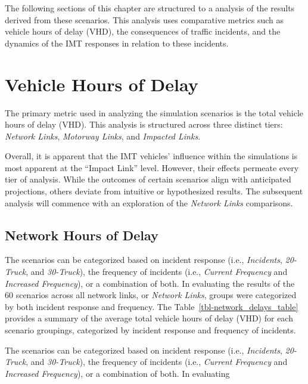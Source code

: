 \documentclass[fancy, oneside, mastersfancy, ms]{byuthesis}
\begin{document}
The following sections of this chapter are structured to a analysis of
the results derived from these scenarios. This analysis uses comparative
metrics such as vehicle hours of delay (VHD), the consequences of
traffic incidents, and the dynamics of the IMT responses in relation to
these incidents.

\hypertarget{vehicle-hours-of-delay}{%
\section{Vehicle Hours of Delay}\label{vehicle-hours-of-delay}}

The primary metric used in analyzing the simulation scenarios is the
total vehicle hours of delay (VHD). This analysis is structured across
three distinct tiers: \emph{Network Links}, \emph{Motorway Links}, and
\emph{Impacted Links}.

Overall, it is apparent that the IMT vehicles' influence within the
simulations is most apparent at the ``Impact Link'' level. However,
their effects permeate every tier of analysis. While the outcomes of
certain scenarios align with anticipated projections, others deviate
from intuitive or hypothesized results. The subsequent analysis will
commence with an exploration of the \emph{Network Links} comparisons.

\hypertarget{network-hours-of-delay}{%
\subsection{Network Hours of Delay}\label{network-hours-of-delay}}

The scenarios can be categorized based on incident response (i.e.,
\emph{Incidents}, \emph{20-Truck}, and \emph{30-Truck}), the frequency
of incidents (i.e., \emph{Current Frequency} and \emph{Increased
Frequency}), or a combination of both. In evaluating the results of the
60 scenarios across all network links, or \emph{Network Links}, groups
were categorized by both incident response and frequency. The
Table~\ref{tbl-network_delays_table} provides a summary of the average
total vehicle hours of delay (VHD) for each scenario groupings,
categorized by incident response and frequency of incidents.

The scenarios can be categorized based on incident response (i.e.,
\emph{Incidents}, \emph{20-Truck}, and \emph{30-Truck}), the frequency
of incidents (i.e., \emph{Current Frequency} and \emph{Increased
Frequency}), or a combination of both. In evaluating
\end{document}
